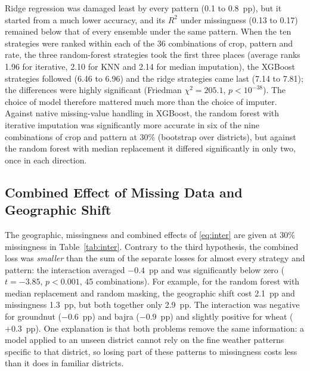 Ridge regression was damaged least by every pattern (0.1 to 0.8~pp), but it started from a much
lower accuracy, and its $R^2$ under missingness (0.13 to 0.17) remained below that of every
ensemble under the same pattern. When the ten strategies were ranked within each of the 36 combinations of crop, pattern
and rate, the three random-forest strategies took the first three places (average ranks 1.96 for
iterative, 2.10 for KNN and 2.14 for median imputation), the XGBoost strategies followed (6.46 to
6.96) and the ridge strategies came last (7.14 to 7.81); the differences were highly significant
(Friedman $\chi^2 = 205.1$, $p < 10^{-38}$). The choice of model therefore mattered much more than
the choice of imputer. Against native missing-value handling in XGBoost, the random forest with
iterative imputation was significantly more accurate in six of the nine combinations of crop and
pattern at 30\% (bootstrap over districts), but against the random forest with median replacement
it differed significantly in only two, once in each direction.

\subsection{Combined Effect of Missing Data and Geographic Shift}

The geographic, missingness and combined effects of \eqref{eq:inter} are given at 30\%
missingness in Table~\ref{tab:inter}. Contrary to the third hypothesis, the combined loss was
\emph{smaller} than the sum of the separate losses for almost every strategy and pattern: the
interaction averaged $-0.4$~pp and was significantly below zero ($t = -3.85$, $p < 0.001$, 45
combinations). For example, for the random forest with median replacement and random masking, the
geographic shift cost 2.1~pp and missingness 1.3~pp, but both together only 2.9~pp. The
interaction was negative for groundnut ($-0.6$~pp) and bajra ($-0.9$~pp) and slightly positive for
wheat ($+0.3$~pp). One explanation is that both problems remove the same information: a model
applied to an unseen district cannot rely on the fine weather patterns specific to that district,
so losing part of these patterns to missingness costs less than it does in familiar districts.

\begin{table}[!t]
\caption{Geographic (Geo.), Missingness (Miss.) and Combined (Comb.) Effects at 30\% Missingness
and Their Interaction (Inter.), in pp of nRMSE, Mean Over Crops}\label{tab:inter}
\centering\footnotesize\setlength{\tabcolsep}{3.5pt}

\end{table}

